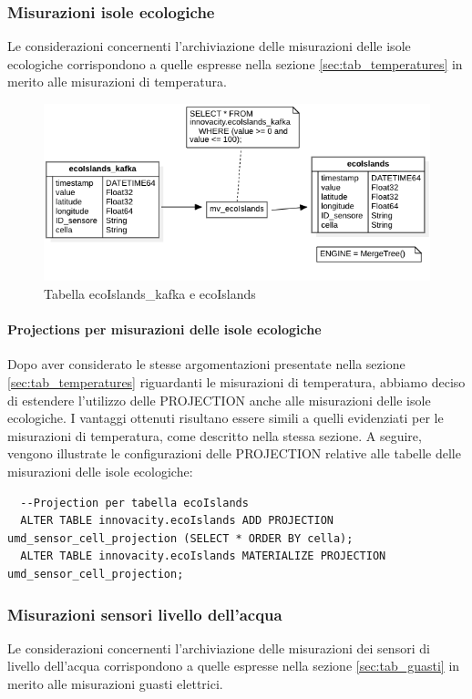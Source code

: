 \subsubsection{Misurazioni isole ecologiche}
Le considerazioni concernenti l'archiviazione delle misurazioni delle isole ecologiche corrispondono a quelle espresse nella sezione \ref{sec:tab_temperatures} in merito alle misurazioni di temperatura.

\begin{figure}[H]
  \centering
  \includegraphics[width=1\textwidth]{../Images/SpecificaTecnica/ecoIslands.png}
  \caption{Tabella ecoIslands\_kafka e ecoIslands}
  \label{fig:ecoIslands_tables}
\end{figure}

\paragraph{Projections per misurazioni delle isole ecologiche} 
Dopo aver considerato le stesse argomentazioni presentate nella sezione \ref{sec:tab_temperatures} riguardanti le misurazioni di temperatura, abbiamo deciso di estendere l'utilizzo delle PROJECTION anche alle misurazioni delle isole ecologiche. I vantaggi ottenuti risultano essere simili a quelli evidenziati per le misurazioni di temperatura, come descritto nella stessa sezione. A seguire, vengono illustrate le configurazioni delle PROJECTION relative alle tabelle delle misurazioni delle isole ecologiche:

\begin{lstlisting}
  --Projection per tabella ecoIslands
  ALTER TABLE innovacity.ecoIslands ADD PROJECTION umd_sensor_cell_projection (SELECT * ORDER BY cella);
  ALTER TABLE innovacity.ecoIslands MATERIALIZE PROJECTION umd_sensor_cell_projection;
\end{lstlisting}

\subsubsection{Misurazioni sensori livello dell’acqua}
Le considerazioni concernenti l'archiviazione delle misurazioni dei sensori di livello dell'acqua corrispondono a quelle espresse nella sezione \ref{sec:tab_guasti} in merito alle misurazioni guasti elettrici.

